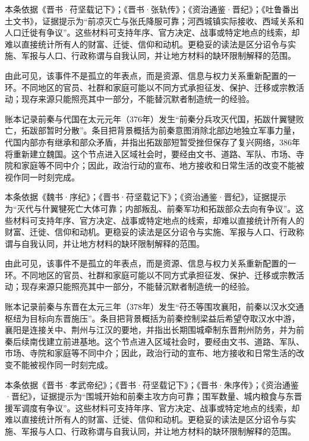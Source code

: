 本条依据《晋书·苻坚载记下》；《晋书·张轨传》；《资治通鉴·晋纪》；《吐鲁番出土文书》，证据提示为“前凉灭亡与张氏降服可靠；河西城镇实际接收、西域关系和人口迁徙有争议”。这些材料可支持年序、官方决定、战事或特定地点的线索，却难以直接统计所有人的财富、迁徙、信仰和动机。更稳妥的读法是区分诏令与实施、军报与人口、行政称谓与自我认同，并让地方材料的缺环限制解释的范围。

由此可见，该事件不是孤立的年表点，而是资源、信息与权力关系重新配置的一环。不同地区的官员、社群和家庭可能以不同方式承担征发、保护、迁移或宗教活动；现存来源只能照亮其中一部分，不能替沉默者制造统一的经验。

账本记录前秦与代国在太元元年（376年）发生“前秦分兵攻灭代国，拓跋什翼犍败亡，拓跋部暂时分散”。条目把背景概括为前秦意图消除北部边地独立军事力量，代国内部亦有继承和部众矛盾，并指出拓跋部短暂受挫但保存了复兴网络，386年将重新建立魏国。这个节点进入区域社会时，要经由文书、道路、军队、市场、寺院和家庭等不同中介；因此，政治行动的宣布、地方接收和日常生活的改变不能被视作同一时刻完成。

本条依据《魏书·序纪》；《晋书·苻坚载记下》；《资治通鉴·晋纪》，证据提示为“灭代与什翼犍死亡大体可靠；内部叛乱、前秦军功和拓跋部众去向有争议”。这些材料可支持年序、官方决定、战事或特定地点的线索，却难以直接统计所有人的财富、迁徙、信仰和动机。更稳妥的读法是区分诏令与实施、军报与人口、行政称谓与自我认同，并让地方材料的缺环限制解释的范围。

由此可见，该事件不是孤立的年表点，而是资源、信息与权力关系重新配置的一环。不同地区的官员、社群和家庭可能以不同方式承担征发、保护、迁移或宗教活动；现存来源只能照亮其中一部分，不能替沉默者制造统一的经验。

账本记录前秦与东晋在太元三年（378年）发生“苻丕等围攻襄阳，前秦以汉水交通枢纽为目标向东晋施压”。条目把背景概括为前秦控制梁益后希望夺取汉水中游，襄阳是连接关中、荆州与江汉的要地，并指出长期围城牵制东晋荆州防务，并为前秦后续南伐建立前进基地。这个节点进入区域社会时，要经由文书、道路、军队、市场、寺院和家庭等不同中介；因此，政治行动的宣布、地方接收和日常生活的改变不能被视作同一时刻完成。

本条依据《晋书·孝武帝纪》；《晋书·苻坚载记下》；《晋书·朱序传》；《资治通鉴·晋纪》，证据提示为“围城开始和前秦主攻方向可靠；围军数量、城内粮食与东晋援军调度有争议”。这些材料可支持年序、官方决定、战事或特定地点的线索，却难以直接统计所有人的财富、迁徙、信仰和动机。更稳妥的读法是区分诏令与实施、军报与人口、行政称谓与自我认同，并让地方材料的缺环限制解释的范围。

